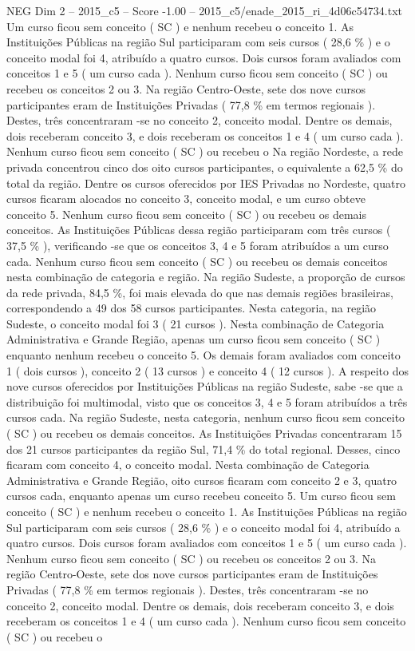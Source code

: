 \begin{textsample}{NEG Dim 2 – 2015\_c5 – Score -1.00 – 2015\_c5/enade\_2015\_ri\_4d06c54734.txt}
Um curso ficou sem conceito ( SC ) e nenhum recebeu o conceito 1.
As Instituições Públicas na região Sul participaram com seis cursos ( 28,6 \% ) e o conceito modal foi 4, atribuído a quatro cursos.
Dois cursos foram avaliados com conceitos 1 e 5 ( um curso cada ).
Nenhum curso ficou sem conceito ( SC ) ou recebeu os conceitos 2 ou 3.
Na região Centro-Oeste, sete dos nove cursos participantes eram de Instituições Privadas ( 77,8 \% em termos regionais ).
Destes, três concentraram -se no conceito 2, conceito modal.
Dentre os demais, dois receberam conceito 3, e dois receberam os conceitos 1 e 4 ( um curso cada ).
Nenhum curso ficou sem conceito ( SC ) ou recebeu o Na região Nordeste, a rede privada concentrou cinco dos oito cursos participantes, o equivalente a 62,5 \% do total da região.
Dentre os cursos oferecidos por IES Privadas no Nordeste, quatro cursos ficaram alocados no conceito 3, conceito modal, e um curso obteve conceito 5.
Nenhum curso ficou sem conceito ( SC ) ou recebeu os demais conceitos.
As Instituições Públicas dessa região participaram com três cursos ( 37,5 \% ), verificando -se que os conceitos 3, 4 e 5 foram atribuídos a um curso cada.
Nenhum curso ficou sem conceito ( SC ) ou recebeu os demais conceitos nesta combinação de categoria e região.
Na região Sudeste, a proporção de cursos da rede privada, 84,5 \%, foi mais elevada do que nas demais regiões brasileiras, correspondendo a 49 dos 58 cursos participantes.
Nesta categoria, na região Sudeste, o conceito modal foi 3 ( 21 cursos ).
Nesta combinação de Categoria Administrativa e Grande Região, apenas um curso ficou sem conceito ( SC ) enquanto nenhum recebeu o conceito 5.
Os demais foram avaliados com conceito 1 ( dois cursos ), conceito 2 ( 13 cursos ) e conceito 4 ( 12 cursos ).
A respeito dos nove cursos oferecidos por Instituições Públicas na região Sudeste, sabe -se que a distribuição foi multimodal, visto que os conceitos 3, 4 e 5 foram atribuídos a três cursos cada.
Na região Sudeste, nesta categoria, nenhum curso ficou sem conceito ( SC ) ou recebeu os demais conceitos.
As Instituições Privadas concentraram 15 dos 21 cursos participantes da região Sul, 71,4 \% do total regional.
Desses, cinco ficaram com conceito 4, o conceito modal.
Nesta combinação de Categoria Administrativa e Grande Região, oito cursos ficaram com conceito 2 e 3, quatro cursos cada, enquanto apenas um curso recebeu conceito 5.
Um curso ficou sem conceito ( SC ) e nenhum recebeu o conceito 1.
As Instituições Públicas na região Sul participaram com seis cursos ( 28,6 \% ) e o conceito modal foi 4, atribuído a quatro cursos.
Dois cursos foram avaliados com conceitos 1 e 5 ( um curso cada ).
Nenhum curso ficou sem conceito ( SC ) ou recebeu os conceitos 2 ou 3.
Na região Centro-Oeste, sete dos nove cursos participantes eram de Instituições Privadas ( 77,8 \% em termos regionais ).
Destes, três concentraram -se no conceito 2, conceito modal.
Dentre os demais, dois receberam conceito 3, e dois receberam os conceitos 1 e 4 ( um curso cada ).
Nenhum curso ficou sem conceito ( SC ) ou recebeu o

\end{textsample}
